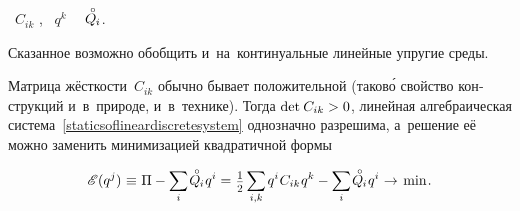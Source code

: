 \begin{otherlanguage}{russian}
\vspace{-0.2em}\noindent
{}
~$C_{ik}$
,
~${q^k}$
~~${\mathcircabove{Q}_{\hspace{-0.1ex}i}}$.

Сказанное возможно обобщить и~на~континуальные линейные упругие среды.

Матрица жёсткости~${C_{ik}}$ обычно бывает положительной (таков\'{о} свойство конструкций и~в~природе, и~в~технике).
Тогда ${\operatorname{det} \hspace{.16ex} C_{ik} > 0}$, линейная алгебраическая система~\eqref{staticsoflineardiscretesystem} однозначно разрешима, а~решение её можно заменить минимизацией квадратичной формы

\nopagebreak\vspace{-0.1em}\begin{equation}\label{discrete:potentialenergyofsystem}
\potentialenergyfunctional \hspace{.2ex} (q^{j}) \hspace{.1ex}
\equiv \hspace{.1ex}
\potentialenergydensity - \scalebox{0.95}[1]{$\displaystyle \sum_{\smash{i}}$} \hspace{.2ex}
\mathcircabove{Q}_{\hspace{-0.1ex}i} \hspace{.12ex} q^{i}
%
= \hspace{.1ex}
\smalldisplaystyleonehalf \hspace{.32ex}
\scalebox{0.95}[1]{$\displaystyle \sum_{\smash{i,k}}$} \hspace{.2ex}
\hspace{.1ex} q^{i} \hspace{.1ex} C_{ik} \hspace{.1ex} q^{k}
- \scalebox{0.95}[1]{$\displaystyle \sum_{\smash{i}}$} \hspace{.2ex}
\mathcircabove{Q}_{\hspace{-0.1ex}i} \hspace{.12ex} q^{i}
%
\hspace{.1ex}\to\hspace{.25ex} \mathrm{min}
\hspace{.16ex} .
\vspace{-0.1em}\end{equation}


\end{otherlanguage}
